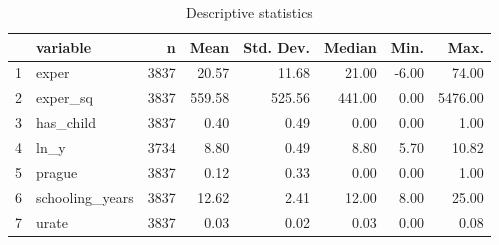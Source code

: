 \begin{table}[ht]
\centering
\caption{Descriptive statistics} 
\begin{tabular}{rlrrrrrr}
  \hline
 & variable & n & Mean & Std. Dev. & Median & Min. & Max. \\ 
  \hline
1 & exper & 3837 & 20.57 & 11.68 & 21.00 & -6.00 & 74.00 \\ 
  2 & exper\_sq & 3837 & 559.58 & 525.56 & 441.00 & 0.00 & 5476.00 \\ 
  3 & has\_child & 3837 & 0.40 & 0.49 & 0.00 & 0.00 & 1.00 \\ 
  4 & ln\_y & 3734 & 8.80 & 0.49 & 8.80 & 5.70 & 10.82 \\ 
  5 & prague & 3837 & 0.12 & 0.33 & 0.00 & 0.00 & 1.00 \\ 
  6 & schooling\_years & 3837 & 12.62 & 2.41 & 12.00 & 8.00 & 25.00 \\ 
  7 & urate & 3837 & 0.03 & 0.02 & 0.03 & 0.00 & 0.08 \\ 
   \hline
\end{tabular}
\end{table}
